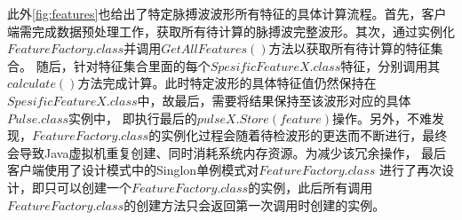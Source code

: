 此外\autoref{fig:features}也给出了特定脉搏波波形所有特征的具体计算流程。首先，客户端需完成数据预处理工作，获取所有待计算的脉搏波完整波形。其次，通过实例化$FeatureFactory.class$并调用$GetAllFeatures()$方法以获取所有待计算的特征集合。
随后，针对特征集合里面的每个$SpesificFeatureX.class$特征，分别调用其$calculate()$方法完成计算。此时特定波形的具体特征值仍然保持在$SpesificFeatureX.class$中，故最后，需要将结果保持至该波形对应的具体$Pulse.class$实例中，
即执行最后的$pulseX.Store(feature)$操作。另外，不难发现，$FeatureFactory.class$的实例化过程会随着待检波形的更迭而不断进行，最终会导致Java虚拟机重复创建、同时消耗系统内存资源。为减少该冗余操作，
最后客户端使用了设计模式中的Singlon单例模式\cite{Li2015}对$FeatureFactory.class$
进行了再次设计，即只可以创建一个$FeatureFactory.class$的实例，此后所有调用$FeatureFactory.class$的创建方法只会返回第一次调用时创建的实例。
